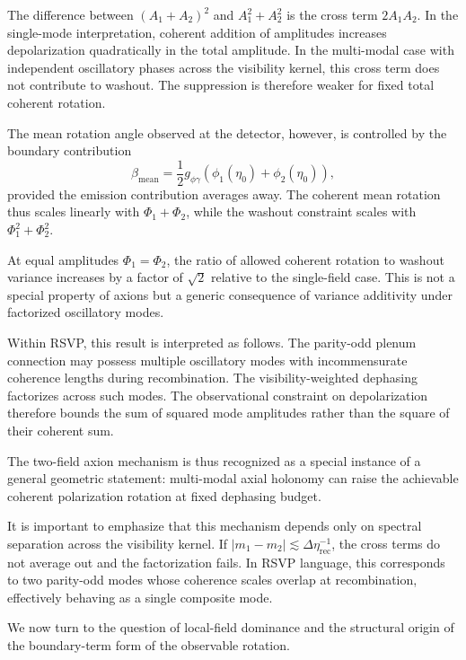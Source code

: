 \documentclass[12pt]{article}
\begin{document}
The difference between $(A_1 + A_2)^2$ and $A_1^2 + A_2^2$ is the cross term $2A_1A_2$. In the single-mode interpretation, coherent addition of amplitudes increases depolarization quadratically in the total amplitude. In the multi-modal case with independent oscillatory phases across the visibility kernel, this cross term does not contribute to washout. The suppression is therefore weaker for fixed total coherent rotation.

The mean rotation angle observed at the detector, however, is controlled by the boundary contribution
\begin{equation}
\beta_{\mathrm{mean}}
=
\frac{1}{2} g_{\phi\gamma}
\left(
\phi_1(\eta_0)
+
\phi_2(\eta_0)
\right),
\end{equation}
provided the emission contribution averages away. The coherent mean rotation thus scales linearly with $\Phi_1 + \Phi_2$, while the washout constraint scales with $\Phi_1^2 + \Phi_2^2$.

At equal amplitudes $\Phi_1 = \Phi_2$, the ratio of allowed coherent rotation to washout variance increases by a factor of $\sqrt{2}$ relative to the single-field case. This is not a special property of axions but a generic consequence of variance additivity under factorized oscillatory modes.

Within RSVP, this result is interpreted as follows. The parity-odd plenum connection may possess multiple oscillatory modes with incommensurate coherence lengths during recombination. The visibility-weighted dephasing factorizes across such modes. The observational constraint on depolarization therefore bounds the sum of squared mode amplitudes rather than the square of their coherent sum.

The two-field axion mechanism is thus recognized as a special instance of a general geometric statement: multi-modal axial holonomy can raise the achievable coherent polarization rotation at fixed dephasing budget.

It is important to emphasize that this mechanism depends only on spectral separation across the visibility kernel. If $|m_1 - m_2| \lesssim \Delta\eta_{\mathrm{rec}}^{-1}$, the cross terms do not average out and the factorization fails. In RSVP language, this corresponds to two parity-odd modes whose coherence scales overlap at recombination, effectively behaving as a single composite mode.

We now turn to the question of local-field dominance and the structural origin of the boundary-term form of the observable rotation.
\end{document}

